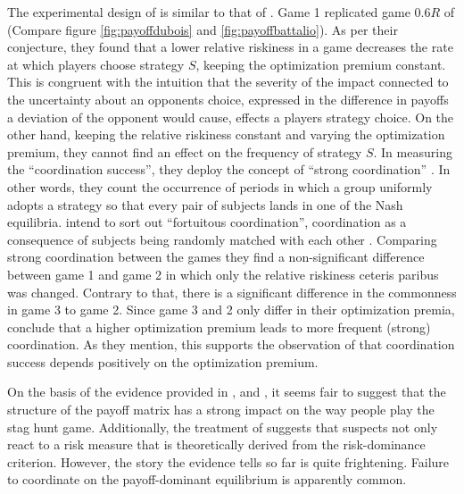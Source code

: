 The experimental design of \textcite{dubois_optimization_2012} is similar
to that of \textcite{battalio_optimization_2001}.
Game 1 replicated game $0.6R$  of \textcite{battalio_optimization_2001}  
(Compare figure \ref{fig:payoffdubois} and \ref{fig:payoffbattalio}). 
As per their conjecture, they found that a lower relative riskiness 
in a game decreases the rate at which players choose strategy $S$, 
keeping the optimization premium constant. This is congruent with 
the intuition that the severity of the impact connected to the uncertainty
about an opponents choice, expressed in
the difference in payoffs a deviation of the opponent would cause,
effects a players strategy choice. 
On the other hand, keeping the relative riskiness constant and varying the
optimization premium, they cannot find an effect on the frequency of 
strategy $S$. 
In measuring the ``coordination success'', they deploy the concept of ``strong
coordination'' \textcite{dubois_optimization_2012}. 
In other words, they count the occurrence of periods in which a group
uniformly adopts a strategy so that every pair of subjects lands in one
of the Nash equilibria. \textcite{dubois_optimization_2012} intend to sort 
out ``fortuitous coordination'', coordination as a consequence of subjects being
randomly matched with each other \parencite[373]{dubois_optimization_2012}.
Comparing strong coordination between the games they find a non-significant 
difference between game 1 and game 2 in which only the relative riskiness 
ceteris paribus was changed. Contrary to that, there is a significant 
difference in the commonness in game 3 to game 2.
Since game 3 and 2 only differ in their optimization premia, 
\textcite{dubois_optimization_2012} conclude that a higher optimization
premium leads to more frequent (strong) coordination. 
As they mention, this supports the observation of 
\textcite{battalio_optimization_2001} that coordination success depends 
positively on the optimization premium. 

On the basis of the evidence provided in \textcite{battalio_optimization_2001},
\textcite{schmidt_playing_2003} and \textcite{dubois_optimization_2012},
it seems fair to suggest that the structure of the payoff matrix has a 
strong impact on the way people play the stag hunt game. Additionally, 
the treatment of \textcite{dubois_optimization_2012} suggests that suspects 
not only react to a risk measure that is theoretically derived from the
risk-dominance criterion.
However, the story the evidence tells so far is quite frightening. 
Failure to coordinate on the payoff-dominant equilibrium is apparently common. 

